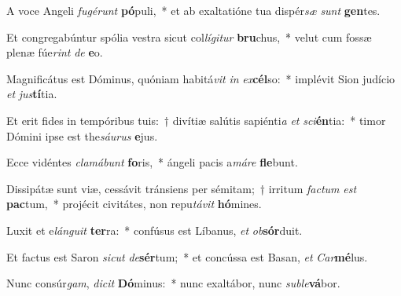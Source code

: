 \item A voce Angeli \textit{fu}\textit{gé}\textit{runt} \textbf{pó}puli,~* et ab exaltatióne tua dispér\textit{sæ} \textit{sunt} \textbf{gen}tes.
\item Et congregabúntur spólia vestra sicut col\textit{lí}\textit{gi}\textit{tur} \textbf{bru}chus,~* velut cum fossæ plenæ fúe\textit{rint} \textit{de} \textbf{e}o.
\item Magnificátus est Dóminus, quóniam habitá\textit{vit} \textit{in} \textit{ex}\textbf{cél}so:~* implévit Sion judício \textit{et} \textit{jus}\textbf{tí}tia.
\item Et erit fides in tempóribus tuis:~† divítiæ salútis sapiénti\textit{a} \textit{et} \textit{sci}\textbf{én}tia:~* timor Dómini ipse est the\textit{sáu}\textit{rus} \textbf{e}jus.
\item Ecce vidéntes \textit{cla}\textit{má}\textit{bunt} \textbf{fo}ris,~* ángeli pacis a\textit{má}\textit{re} \textbf{fle}bunt.
\item Dissipátæ sunt viæ, cessávit tránsiens per sémitam;~† irritum \textit{fac}\textit{tum} \textit{est} \textbf{pac}tum,~* projécit civitátes, non repu\textit{tá}\textit{vit} \textbf{hó}mines.
\item Luxit et e\textit{lán}\textit{gu}\textit{it} \textbf{ter}ra:~* confúsus est Líbanus, \textit{et} \textit{ob}\textbf{sór}duit.
\item Et factus est Saron \textit{sic}\textit{ut} \textit{de}\textbf{sér}tum;~* et concússa est Basan, \textit{et} \textit{Car}\textbf{mé}lus.
\item Nunc consúr\textit{gam}, \textit{di}\textit{cit} \textbf{Dó}minus:~* nunc exaltábor, nunc \textit{sub}\textit{le}\textbf{vá}bor.
